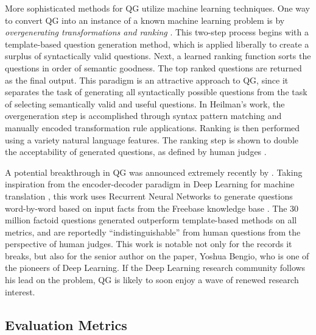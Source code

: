 More sophisticated methods for QG utilize machine learning techniques. One way to convert QG into an instance of a known machine learning problem is by \textit{overgenerating transformations and ranking} \citep{heilman2010extracting, heilman2010good, heilman2011automatic, mannem2010question}. This two-step process begins with a template-based question generation method, which is applied liberally to create a surplus of syntactically valid questions. Next, a learned ranking function sorts the questions in order of semantic goodness. The top ranked questions are returned as the final output. This paradigm is an attractive approach to QG, since it separates the task of generating all syntactically possible questions from the task of selecting semantically valid and useful questions. In Heilman's work, the overgeneration step is accomplished through syntax pattern matching and manually encoded transformation rule applications. Ranking is then performed using a variety natural language features. The ranking step is shown to double the acceptability of generated questions, as defined by human judges \citep{heilman2011automatic}. 

A potential breakthrough in QG was announced extremely recently by \citet{1603.06807}. Taking inspiration from the encoder-decoder paradigm in Deep Learning for machine translation \citep{cho2014learning}, this work uses Recurrent Neural Networks to generate questions word-by-word based on input facts from the Freebase knowledge base \citep{bollacker2008freebase}. The 30 million factoid questions generated outperform template-based methods on all metrics, and are reportedly ``indistinguishable'' from human questions from the perspective of human judges. This work is notable not only for the records it breaks, but also for the senior author on the paper, Yoshua Bengio, who is one of the pioneers of Deep Learning. If the Deep Learning research community follows his lead on the problem, QG is likely to soon enjoy a wave of renewed research interest.

\subsection{Evaluation Metrics}

